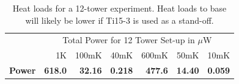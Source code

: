\documentclass{report}
\begin{document}
\begin{table}[h]
\begin{threeparttable}
\begin{tabular}{rrrr|rrr}
\toprule
 & \multicolumn{6}{c}{\large{Total Power for 12 Tower Set-up in $\mu$W}} \\
  & 1K & 100mK & 40mK & 600mK & 50mK & 10mK \\
 \cmidrule(r){2-7}
   \bf{\large{Power}} & \large{\bf{618.0}} & \large{\bf{32.16}} & \large{\bf{0.218}} & \large{\bf{477.6}} & \large{\bf{14.40}} & \large{\bf{0.059}} \\
\bottomrule
\end{tabular}
\end{threeparttable}
\caption{Heat loads for a 12-tower experiment. Heat loads to base will likely be lower if Ti15-3 is used as a stand-off.}
\end{table}


\newpage
\end{document}
